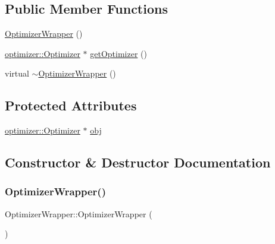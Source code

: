 \subsection*{Public Member Functions}
\begin{DoxyCompactItemize}
\item 
\mbox{\hyperlink{class_optimizer_wrapper_a7c2e70beb700e257e4aac23bb00c8491}{Optimizer\+Wrapper}} ()
\item 
\mbox{\hyperlink{classoptimizer_1_1_optimizer}{optimizer\+::\+Optimizer}} $\ast$ \mbox{\hyperlink{class_optimizer_wrapper_a422b3c46712a92935aca94a3479608da}{get\+Optimizer}} ()
\item 
virtual \mbox{\hyperlink{class_optimizer_wrapper_a811e35c3f8291fb1d892dfa2c55a5fff}{$\sim$\+Optimizer\+Wrapper}} ()
\end{DoxyCompactItemize}
\subsection*{Protected Attributes}
\begin{DoxyCompactItemize}
\item 
\mbox{\hyperlink{classoptimizer_1_1_optimizer}{optimizer\+::\+Optimizer}} $\ast$ \mbox{\hyperlink{class_optimizer_wrapper_ad13a4b9b51410c03d62fb668b5c91d70}{obj}}
\end{DoxyCompactItemize}


\subsection{Constructor \& Destructor Documentation}
\mbox{\label{class_optimizer_wrapper_a7c2e70beb700e257e4aac23bb00c8491}} 
\subsubsection{\texorpdfstring{Optimizer\+Wrapper()}{OptimizerWrapper()}}
{\footnotesize\ttfamily Optimizer\+Wrapper\+::\+Optimizer\+Wrapper (\begin{DoxyParamCaption}{ }\end{DoxyParamCaption})\hspace{0.3cm}{\ttfamily [inline]}}

\mbox{\label{class_optimizer_wrapper_a811e35c3f8291fb1d892dfa2c55a5fff}} 
